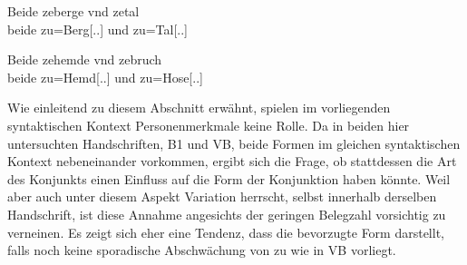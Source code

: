 \begin{exe}
\ex \label{ex:syntintvar2}
\begin{xlist}
	\ex \label{ex:syntintvar2_1}
		\begin{taggedline}{\parencites[\pno~21rc,30]{kc:B1}[zu][\pno~7572--7583]{schroeder1895}}
		\end{taggedline}

	\ex \label{ex:syntintvar2_3}
		\begin{taggedline}{\parencites[\pno~36vb,13]{kc:VB}[zu][\pno~7572--7583]{schroeder1895}}
		\end{taggedline}
\end{xlist}

\ex \label{ex:syntintvar5}
\begin{xlist}
	\ex \label{ex:syntintvar2_2}
		\begin{taggedline}{\parencites[\pno~32rb,35]{kc:B1}[zu][11610\psqq]{schroeder1895}}
		\end{taggedline}

	\ex \label{ex:syntintvar2_4}
		\gll Beide zeberge vnd zetal \\
			beide zu=Berg[\Dat.\Sg.\MascI] und zu=Tal[\Dat.\Sg.\NeutI] \\
		\begin{taggedline}{\parencites[\pno~83vb,3]{kc:VB}[zu][11610\psqq]{schroeder1895}}
		\trans {}
		\end{taggedline}
\end{xlist}

\ex \label{ex:syntintvar4}
	\gll Beide zehemde vnd zebruch \\
		beide zu=Hemd[\Dat.\Sg.\NeutI] und zu=Hose[\Dat.\Sg.\FemI] \\
	\begin{taggedline}{\parencites[\pno~99rb,21]{kc:VB}[vgl.~abweichend][\pno~14799]{schroeder1895}}
	\trans {}
	\end{taggedline}
\end{exe}

Wie einleitend zu diesem Abschnitt erwähnt, spielen im vorliegenden
syntaktischen Kontext Personenmerkmale keine Rolle. Da in beiden hier
untersuchten Handschriften, B1 und VB, beide Formen im
gleichen syntaktischen Kontext nebeneinander vorkommen, ergibt sich die Frage,
ob stattdessen die Art des Konjunkts einen Einfluss auf die Form der
Konjunktion haben könnte. Weil aber auch unter diesem Aspekt Variation
herrscht, selbst innerhalb derselben Handschrift, ist diese Annahme angesichts
der geringen Belegzahl vorsichtig zu verneinen. Es zeigt sich eher eine
Tendenz, dass  die bevorzugte Form darstellt, falls noch keine
sporadische Abschwächung von  zu  wie in VB
vorliegt.

